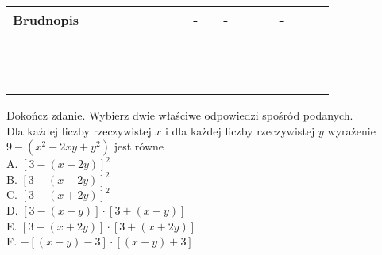 \documentclass[10pt]{article}
\begin{document}
\begin{center}
\begin{tabular}{|c|c|c|c|c|c|c|c|c|c|c|c|c|c|c|c|c|c|c|c|c|c|c|}
\hline
\multicolumn{5}{|l|}{Brudnopis} &  &  &  &  &  &  &  &  & - &  & - &  &  &  & - &  &  &  \\
\hline
 &  &  &  &  &  &  &  &  &  &  &  &  &  &  &  &  &  &  &  &  &  &  \\
\hline
 &  &  &  &  &  &  &  &  &  &  &  &  &  &  &  &  &  &  &  &  &  &  \\
\hline
 &  &  &  &  &  &  &  &  &  &  &  &  &  &  &  &  &  &  &  &  &  &  \\
\hline
 &  &  &  &  &  &  &  &  &  &  &  &  &  &  &  &  &  &  &  &  &  &  \\
\hline
 &  &  &  &  &  &  &  &  &  &  &  &  &  &  &  &  &  &  &  &  &  &  \\
\hline
 &  &  &  &  &  &  &  &  &  &  &  &  &  &  &  &  &  &  &  &  &  &  \\
\hline
 &  &  &  &  &  &  &  &  &  &  &  &  &  &  &  &  &  &  &  &  &  &  \\
\hline
 &  &  &  &  &  &  &  &  &  &  &  &  &  &  &  &  &  &  &  &  &  &  \\
\hline
 &  &  &  &  &  &  &  &  &  &  &  &  &  &  &  &  &  &  &  &  &  &  \\
\hline
 &  &  &  &  &  &  &  &  &  &  &  &  &  &  &  &  &  &  &  &  &  &  \\
\hline
 &  &  &  &  &  &  &  &  &  &  &  &  &  &  &  &  &  &  &  &  &  &  \\
\hline
 &  &  &  &  &  &  &  &  &  &  &  &  &  &  &  &  &  &  &  &  &  &  \\
\hline
 &  &  &  &  &  &  &  &  &  &  &  &  &  &  &  &  &  &  &  &  &  &  \\
\hline
\end{tabular}
\end{center}

Dokończ zdanie. Wybierz dwie właściwe odpowiedzi spośród podanych.\\
Dla każdej liczby rzeczywistej \(x\) i dla każdej liczby rzeczywistej \(y\) wyrażenie \(9-\left(x^{2}-2 x y+y^{2}\right)\) jest równe\\
A. \([3-(x-2 y)]^{2}\)\\
B. \([3+(x-2 y)]^{2}\)\\
C. \([3-(x+2 y)]^{2}\)\\
D. \([3-(x-y)] \cdot[3+(x-y)]\)\\
E. \([3-(x+2 y)] \cdot[3+(x+2 y)]\)\\
F. \(-[(x-y)-3] \cdot[(x-y)+3]\)
\end{document}
